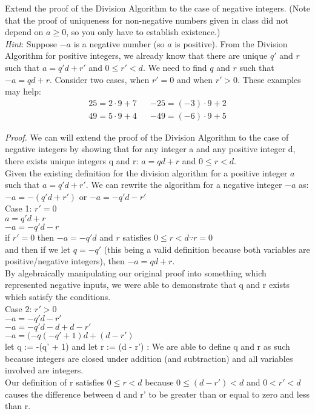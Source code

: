 \begin{problem}
    Extend the proof of the Division Algorithm to the case of negative integers. (Note that the proof of uniqueness for non-negative numbers given in class did not depend on $a \geq 0$, so you only have to establish existence.) \\
    \emph{Hint}: Suppose $-a$ is a negative number (so $a$ is positive). From the Division Algorithm for positive integers, we already know that there are unique $q'$ and $r$ such that $a=q'd+r'$ and $0\leq r'<d$. We need to find $q$ and $r$ such that $-a=qd+r$. Consider two cases, when $r'=0$ and when $r'>0$. These examples may help:
    \begin{align}
        25=2\cdot9+7 &  & -25=(-3)\cdot 9+2 \\
        49=5\cdot 9+4 &  & -49=(-6)\cdot 9+5
    \end{align}
    \begin{solution}
        \emph{Proof.} We can will extend the proof of the Division Algorithm to the case of negative integers by showing that for any integer a and any positive integer d, there exists unique integers q and r: $a = qd + r$ and $0 \leq r < d$. \\
        Given the existing definition for the division algorithm for a positive integer $a$ such that
        $a = q'd + r'$. We can rewrite the algorithm for a negative integer $-a$ as: $-a = -(q'd + r')$ or $-a = -q'd - r'$ \\

        Case 1: $r' = 0$ \\
        $a = q'd +r$\\
        $-a = -q'd - r$ \\
        if $r' = 0$ then $-a = -q'd$ and  $r$ satisfies $0 \leq r < d \because r = 0$ \\
        and then if we let $q = -q'$ (this being a valid definition because both variables are positive/negative integers), then $-a = qd + r$. \\
        By algebraically manipulating our original proof into something which represented negative inputs, we were able to demonstrate that q and r exists which satisfy the conditions. \\

        Case 2: $r' > 0$ \\
        $-a = -q'd - r'$ \\
        $-a = -q'd - d + d - r'$ \\
        $-a = (-q(-q' + 1)d + (d - r')$ \\
        let q := -(q' + 1) and let r := (d - r') : We are able to define q and r as such because integers are closed under addition (and subtraction) and all variables involved are integers. \\
        Our definition of r satisfies $0 \leq r < d$ because $0 \leq (d - r') < d$ and $0 < r' < d$ causes the difference between d and r' to be greater than or equal to zero and less than r.


\end{solution}
\end{problem}
